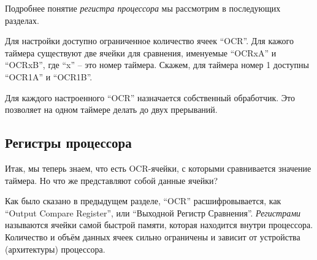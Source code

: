 \documentclass[../sparc.tex]{subfiles}
\begin{document}
Подробнее понятие \emph{регистра процессора} мы рассмотрим в последующих
разделах.

Для настройки доступно ограниченное количество ячеек ``OCR''.  Для кажого
таймера существуют две ячейки для сравнения, именуемые ``OCRxA'' и ``OCRxB'',
где ``x'' -- это номер таймера.  Скажем, для таймера номер 1 доступны ``OCR1A'' и
``OCR1B''.

Для каждого настроенного ``OCR'' назначается собственный обработчик.  Это
позволяет на одном таймере делать до двух прерываний.

\subsection{Регистры процессора}

Итак, мы теперь знаем, что есть \gls{OCR}-ячейки, с которыми сравнивается
значение таймера.  Но что же представляют собой данные ячейки?

Как было сказано в предыдущем разделе, ``OCR'' расшифровывается, как ``Output
Compare Register'', или ``Выходной Регистр Сравнения''.  \emph{Регистрами}
называются ячейки самой быстрой памяти, которая находится внутри процессора.
Количество и объём данных ячеек сильно ограничены и зависит от устройства
(архитектуры) процессора.
\end{document}
